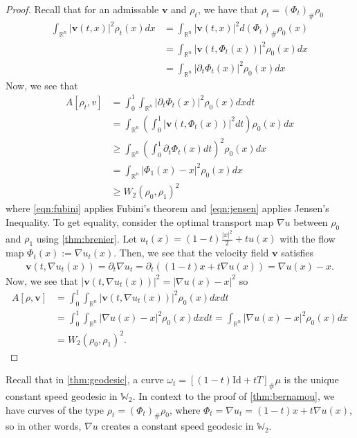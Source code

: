 \documentclass[12pt]{article}
\newcommand{\R}{\mathbb{R}}
\theoremstyle{plain}
\numberwithin{equation}{section}
\begin{document}
\begin{proof}
  Recall that for an admissable $\mathbf{v}$ and $\rho_t$, we have that $\rho_t = (\Phi_t)_\#\rho_0$
  \begin{align*}
		\int_{\mathbb{R}^n}|\mathbf{v}(t,x)|^2\rho_t(x)dx &= \int_{\mathbb{R}^n}|\mathbf{v}(t,x)|^2 d(\Phi_t)_\#\rho_0(x)\\
		&= \int_{\mathbb{R}^n}|\mathbf{v}(t,\Phi_t(x))|^2\rho_0(x)dx\\
    &= \int_{\mathbb{R}^n}|\partial_t\Phi_t(x)|^2\rho_0(x)dx
	\end{align*}
	Now, we see that 
	\begin{align}
		A[\rho_t,v] &= \int_0^1\int_{\mathbb{R}^n}|\partial_t\Phi_t(x)|^2\rho_0(x)dxdt \\
    &= \int_{\mathbb{R}^n}\left(\int_0^1|\mathbf{v}(t,\Phi_t(x))|^2dt\right)\rho_0(x)dx\label{eqn:fubini} \\
		&\ge \int_{\mathbb{R}^n}\left(\int_0^1\partial_t\Phi_t(x)dt\right)^2\rho_0(x)dx\label{eqn:jensen} \\
    &= \int_{\mathbb{R}^n}|\Phi_1(x) - x|^2\rho_0(x)dx\\
		& \ge W_2(\rho_0,\rho_1)^2
	\end{align}
  where \autoref{eqn:fubini} applies Fubini's theorem and \autoref{eqn:jensen} applies Jensen's Inequality.\newline
  To get equality, consider the optimal transport map $\nabla u$ between $\rho_0$ and $\rho_1$ using \autoref{thm:brenier}. Let $u_t(x) = (1-t)\frac{|x|^2}{2}+tu(x)$ with the flow map $\Phi_t(x) := \nabla u_t(x)$. 
  Then, we see that the velocity field $\mathbf{v}$ satisfies 
  \begin{align*}
    \mathbf{v}(t,\nabla u_t(x)) = \partial_t\nabla u_t = \partial_t((1-t)x + t\nabla u(x)) = \nabla u(x) - x.
  \end{align*}
  Now, we see that $|\mathbf{v}(t,\nabla u_t(x))|^2 = |\nabla u(x) - x|^2$ so 
  \begin{align*}
    A[\rho,\mathbf{v}] &= \int_0^1\int_{\R^n} |\mathbf{v}(t,\nabla u_t(x))|^2\rho_0(x)dxdt \\
    &= \int_0^1\int_{\R^n} |\nabla u(x) - x|^2\rho_0(x)dxdt = \int_{\R^n} |\nabla u(x) - x|^2\rho_0(x) dx \\
    &= W_2(\rho_0,\rho_1)^2.
  \end{align*}
\end{proof}
Recall that in \autoref{thm:geodesic}, a curve $\omega_t = \left[(1-t)\text{Id} + tT\right]_\#\mu$ is the unique constant speed geodesic in $\mathbb{W}_2$. In context to the proof of \autoref{thm:bernamou}, we have curves of the type $\rho_t = (\Phi_t)_\# \rho_0$, where $\Phi_t = \nabla u_t=(1-t)x + t\nabla u(x)$, so in other words, $\nabla u$ creates a constant speed geodesic in $\mathbb{W}_2$.
\end{document}
